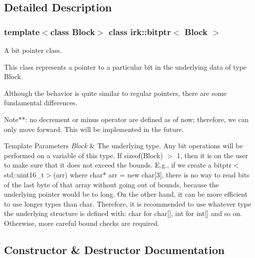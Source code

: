 \subsection{Detailed Description}
\subsubsection*{template$<$class Block$>$\newline
class irk\+::bitptr$<$ Block $>$}

A bit pointer class. 

This class represents a pointer to a particular bit in the underlying data of type {\ttfamily Block}.

Although the behavior is quite similar to regular pointers, there are some fundamental differences.

Note$\ast$$\ast$\+: no decrement or minus operator are defined as of now; therefore, we can only move forward. This will be implemented in the future.


\begin{DoxyTemplParams}{Template Parameters}
{\em Block} & The underlying type. Any bit operations will be performed on a variable of this type. If {\ttfamily sizeof(\+Block) $>$ 1}, then it is on the user to make sure that it does not exceed the bounds. E.\+g., if we create a {\ttfamily bitptr$<$std\+::uint16\+\_\+t$>$(arr)} where {\ttfamily char$\ast$ arr = new char\mbox{[}3\mbox{]}}, there is no way to read bits of the last byte of that array without going out of bounds, because the underlying pointer would be to long. On the other hand, it can be more efficient to use longer types than {\ttfamily char}. Therefore, it is recommended to use whatever type the underlying structure is defined with\+: {\ttfamily char} for {\ttfamily char\mbox{[}\mbox{]}}, {\ttfamily int} for {\ttfamily int\mbox{[}\mbox{]}} and so on. Otherwise, more careful bound checks are required. \\
\hline
\end{DoxyTemplParams}


\subsection{Constructor \& Destructor Documentation}
\mbox{\label{classirk_1_1bitptr_acd28cbb88a0840befdd9bc7a7260f036}} 
